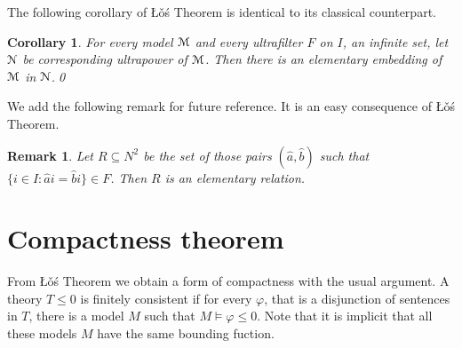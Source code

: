 \documentclass[12pt,letterpaper,oneside,reqno]{amsart}
\theoremstyle{plain}
\newtheorem{corollary}[theorem]{Corollary}
\newtheorem{remark}[theorem]{Remark}
\theoremstyle{remark}
\begin{document}





The following corollary of  \L\v{o}\'s Theorem is identical to its classical counterpart.

\begin{corollary}
  For every model ${\EuScript M}$ and every ultrafilter $F$ on $I$, an infinite set, let ${\EuScript N}$ be corresponding ultrapower of ${\EuScript M}$.
  Then there is an elementary embedding of ${\EuScript M}$ in ${\EuScript N}$.\qed
\end{corollary}

We add the following remark for future reference.
It is an easy consequence of \L\v o\'s Theorem.

\begin{remark}
  Let $R\subseteq N^2$ be the set of those pairs $(\hat a, \hat b)$ such that $\{i\in I:\hat ai=\hat bi\}\in F$.
  Then $R$ is an elementary relation.
\end{remark}

\section{Compactness theorem}\label{compactness}

\def\ceq#1#2#3{\parbox[t]{20ex}{$\displaystyle #1$}\parbox{5ex}{\hfil $#2$}{$\displaystyle #3$}}

From \L\v{o}\'s Theorem we obtain a form of compactness with the usual argument. A theory $T\le0$ is finitely consistent if for every $\varphi$, that is a disjunction of sentences in $T$, there is a model $M$ such that $M\models \varphi\le0$.
Note that it is implicit that all these models $M$ have the same bounding fuction.
\end{document}
